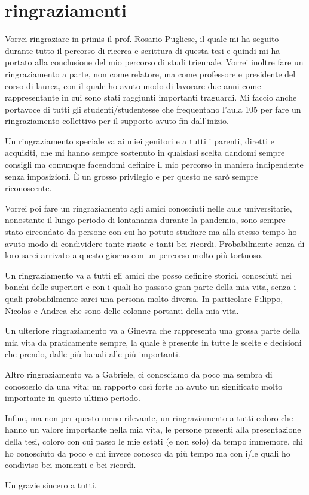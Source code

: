\chapter*{ringraziamenti}
\pagestyle{plain}
Vorrei ringraziare in primis il prof. Rosario Pugliese, il quale mi ha seguito durante tutto il percorso di ricerca e scrittura di questa tesi e quindi mi ha portato alla conclusione del mio percorso di studi triennale. Vorrei inoltre fare un ringraziamento a parte, non come relatore, ma come professore e presidente del corso di laurea, con il quale ho avuto modo di lavorare due anni come rappresentante in cui sono stati raggiunti importanti traguardi. Mi faccio anche portavoce di tutti gli studenti/studentesse che frequentano l'aula 105 per fare un ringraziamento collettivo per il supporto avuto fin dall'inizio.
\newline

Un ringraziamento speciale va ai miei genitori e a tutti i parenti, diretti e acquisiti, che mi hanno sempre sostenuto in qualsiasi scelta  dandomi sempre consigli ma comunque facendomi definire il mio percorso in maniera indipendente senza imposizioni. È un grosso privilegio e per questo ne sarò sempre riconoscente.
\newline

Vorrei poi fare un ringraziamento agli amici conosciuti nelle aule universitarie, nonostante il lungo periodo di lontananza durante la pandemia, sono sempre stato circondato da persone con cui ho potuto studiare ma alla stesso tempo ho avuto modo di condividere tante risate e tanti bei ricordi. Probabilmente senza di loro sarei arrivato a questo giorno con un percorso molto più tortuoso.
\newline

Un ringraziamento va a tutti gli amici che posso definire storici, conosciuti nei banchi delle superiori e con i quali ho passato gran parte della mia vita, senza i quali probabilmente sarei una persona molto diversa. In particolare Filippo, Nicolas e Andrea che sono delle colonne portanti della mia vita.
\newline

Un ulteriore ringraziamento va a Ginevra che rappresenta una grossa parte della mia vita da praticamente sempre, la quale è presente in tutte le scelte e decisioni che prendo, dalle più banali alle più importanti.
\newline

Altro ringraziamento va a Gabriele, ci conosciamo da poco ma sembra di conoscerlo da una vita; un rapporto così forte ha avuto un significato molto importante in questo ultimo periodo.
\newline

Infine, ma non per questo meno rilevante, un ringraziamento a tutti coloro che hanno un valore importante nella mia vita, le persone presenti alla presentazione della tesi, coloro con cui passo le mie estati (e non solo) da tempo immemore, chi ho conosciuto da poco e chi invece conosco da più tempo ma con i/le quali ho condiviso bei momenti e bei ricordi.
\newline

Un grazie sincero a tutti.
